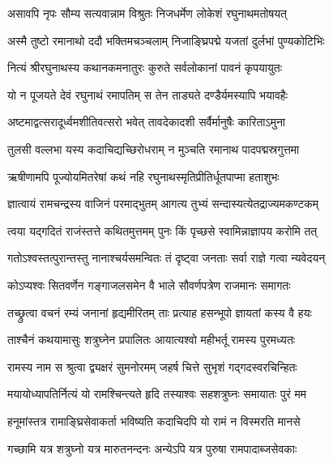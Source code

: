 \resetShloka


\twolineshloka
{असावपि नृपः सौम्य सत्यवान्नाम विश्रुतः}
{निजधर्मेण लोकेशं रघुनाथमतोषयत्}%

\twolineshloka
{अस्मै तुष्टो रमानाथो ददौ भक्तिमचञ्चलाम्}
{निजाङ्घ्रिपद्मे यजतां दुर्लभां पुण्यकोटिभिः}%

\twolineshloka
{नित्यं श्रीरघुनाथस्य कथानकमनातुरः}
{कुरुते सर्वलोकानां पावनं कृपयायुतः}%

\twolineshloka
{यो न पूजयते देवं रघुनाथं रमापतिम्}
{स तेन ताड्यते दण्डैर्यमस्यापि भयावहैः}%

\twolineshloka
{अष्टमाद्वत्सरादूर्ध्वमशीतिवत्सरो भवेत्}
{तावदेकादशी सर्वैर्मानुषैः कारिताऽमुना}%

\twolineshloka
{तुलसी वल्लभा यस्य कदाचिद्यच्छिरोधराम्}
{न मुञ्चति रमानाथ पादपद्मस्रगुत्तमा}%

\twolineshloka
{ऋषीणामपि पूज्योयमितरेषां कथं नहि}
{रघुनाथस्मृतिप्रीतिर्धूतपाप्मा हताशुभः}%

\twolineshloka
{ज्ञात्वायं रामचन्द्रस्य वाजिनं परमाद्भुतम्}
{आगत्य तुभ्यं सन्दास्यत्येतद्राज्यमकण्टकम्}%

\twolineshloka
{त्वया यद्गदितं राजंस्तत्ते कथितमुत्तमम्}
{पुनः किं पृच्छसे स्वामिन्नाज्ञापय करोमि तत्}%


\twolineshloka
{गतोऽश्वस्तत्पुरान्तस्तु नानाश्चर्यसमन्वितः}
{तं दृष्ट्वा जनताः सर्वा राज्ञे गत्वा न्यवेदयन्}%


\twolineshloka
{कोऽप्यश्वः सितवर्णेन गङ्गाजलसमेन वै}
{भाले सौवर्णपत्रेण राजमानः समागतः}%

\twolineshloka
{तच्छ्रुत्वा वचनं रम्यं जनानां हृद्यमीरितम्}
{ताः प्रत्याह हसन्भूपो ज्ञायतां कस्य वै हयः}%

\twolineshloka
{ताश्चैनं कथयामासुः शत्रुघ्नेन प्रपालितः}
{आयात्यश्वो महीभर्तू रामस्य पुरमध्यतः}%

\twolineshloka
{रामस्य नाम स श्रुत्वा द्व्यक्षरं सुमनोरमम्}
{जहर्ष चित्ते सुभृशं गद्गदस्वरचिन्हितः}%

\twolineshloka
{मयायोध्यापतिर्नित्यं यो रामश्चिन्त्यते हृदि}
{तस्याश्वः सहशत्रुघ्नः समायातः पुरं मम}%

\twolineshloka
{हनूमांस्तत्र रामाङ्घ्रिसेवाकर्ता भविष्यति}
{कदाचिदपि यो रामं न विस्मरति मानसे}%

\twolineshloka
{गच्छामि यत्र शत्रुघ्नो यत्र मारुतनन्दनः}
{अन्येऽपि यत्र पुरुषा रामपादाब्जसेवकाः}%

